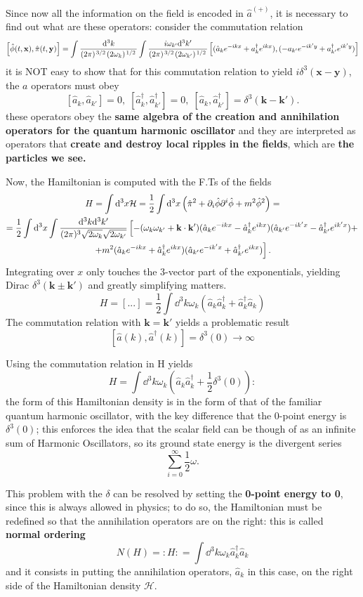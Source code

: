 Since now all the information on the field is encoded in $\hat a^{(+)}$, it is
necessary to find out what are these operators: consider the commutation relation
$$\left[\hat\phi(t,\mathbf{x}),\hat\pi(t,\mathbf{y})\right] = 
\int \frac{\dd^3k}{(2\pi)^{\flatfrac{3}{2}}(2\omega_k)^{\flatfrac{1}{2}}}
\int \frac{i\omega_{k'}\dd^3k'}{(2\pi)^{\flatfrac{3}{2}}(2\omega_{k'})^
{\flatfrac{1}{2}}}\left[(\hat a_ke^{-ikx}+a_k^\dagger e^{ikx}),
(-a_{k'}e^{-ik'y}+a^\dagger_{k'}e^{ik'y})\right]$$
it is NOT easy to show that for this commutation relation to yield
$i\delta^3(\mathbf{x}-\mathbf{y})$, the $a$ operators must obey
$$\boxed{
    \left[\hat a_k,\hat a_{k'}\right]=0,\;
    \left[\hat a_k^\dagger,\hat a_{k'}^\dagger\right]=0,\;
    \left[\hat a_k,\hat a_{k'}^\dagger\right]=\delta^3(\mathbf{k-k'}).
}$$
these operators obey the \textbf{same algebra of the creation and annihilation
operators for the quantum harmonic oscillator} and they are interpreted
as operators that \textbf{create and destroy local ripples in the fields}, which
are \textbf{the particles we see.}

Now, the Hamiltonian is computed with the F.Ts of the fields
\begin{gather*}
H =\int \dd ^3x \mathcal{H} =  \frac{1}{2}\int \dd ^3x \left(
\hat\pi^2 +\partial_i\hat\phi\partial^i\hat\phi + m^2\hat\phi^2\right)=\\
=\frac{1}{2}\int \dd^3x \int \frac{\dd^3k\dd^3k'}{(2\pi)^3\sqrt{2\omega_k}
\sqrt{2\omega_{k'}}}\left[
-(\omega_k\omega_{k'}+\mathbf{k\cdot k'})(\hat a_ke^{-ikx}-\hat a_k^\dagger e^{ikx})
(\hat a_{k'}e^{-ik'x}-\hat a^\dagger_{k'}e^{ik'x})+\right. \\
\left. +m^2(\hat a_ke^{-ikx}+\hat a_k^\dagger 
e^{ikx})(\hat a_{k'}e^{-ik'x}+\hat a_{k'}^\dagger e^{ikx})\right].
\end{gather*}
Integrating over $x$ only touches the 3-vector part of the exponentials,
yielding Dirac $\delta^3(\mathbf{k\pm k'})$ and greatly simplifying matters.
$$H =[...]= \frac{1}{2}\int \dd^3k \omega_k(\hat a_k\hat a^\dagger_k+
\hat a^\dagger_k\hat a_k)$$
The commutation relation with $\mathbf{k=k'}$ yields a problematic result
$$\left[\hat a(k),\hat a^\dagger(k)\right] = \delta^3(0)\to\infty$$

Using the commutation relation in H yields
$$H = \int \dd^3k \omega_k\left(\hat a_k \hat a_k^\dagger+\frac{1}{2}
\delta^3(0)\right):$$
the form of this Hamiltonian density is in the form of that of the familiar
quantum harmonic oscillator, with the key difference that the $0$-point energy
is $\delta^3(0)$; this enforces the idea that the scalar field can
be though of as an infinite sum of Harmonic Oscillators,
so its ground state energy is the divergent series
$$\sum_{i=0}^{\infty}\frac{1}{2}\omega.$$

This problem with the $\delta$ can be resolved by setting the \textbf{0-point
energy to 0}, since this is always allowed in physics; to do so, the Hamiltonian
must be redefined so that the annihilation operators are on the right: this is
called \textbf{normal ordering}
$$N(H) = :H: =\int \dd^3k \omega_k \hat a^\dagger_k\hat a_k$$
and it consists in putting the annihilation operators, $\hat a_k$ in this case,
on the right side of the Hamiltonian density $\mathcal{H}$.
